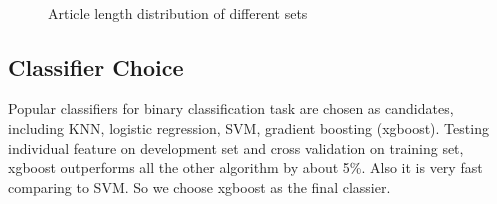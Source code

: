 \begin{figure}
\centering  
{}\hfill
{}\hfill
{}\\

\caption{Article length distribution of different sets}
\label{fig:040length}
\end{figure}

\subsection{Classifier Choice}
Popular classifiers for binary classification task are chosen as candidates, including KNN, logistic regression, SVM, gradient boosting (xgboost). Testing individual feature on development set and cross validation on training set, xgboost outperforms all the other algorithm by about 5\%. Also it is very fast comparing to SVM. So we choose xgboost as the final classier.

